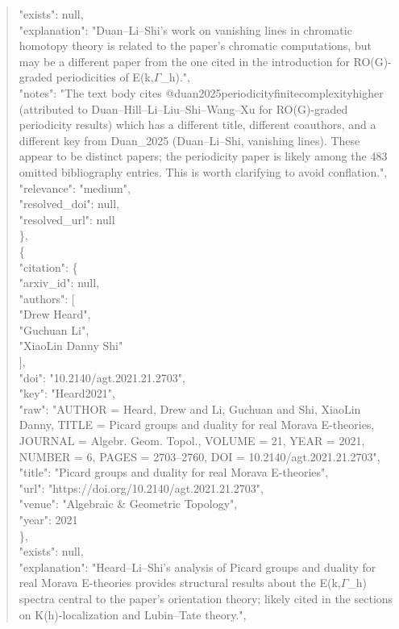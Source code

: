 \documentclass[11pt]{article}
\begin{document}
\begin{quote}
      "exists": null,\\
      "explanation": "Duan--Li--Shi's work on vanishing lines in chromatic homotopy theory is related to the paper's chromatic computations, but may be a different paper from the one cited in the introduction for RO(G)-graded periodicities of E(k,\ensuremath{\Gamma}\_h).",\\
      "notes": "The text body cites @duan2025periodicityfinitecomplexityhigher (attributed to Duan--Hill--Li--Liu--Shi--Wang--Xu for RO(G)-graded periodicity results) which has a different title, different coauthors, and a different key from Duan\_2025 (Duan--Li--Shi, vanishing lines). These appear to be distinct papers; the periodicity paper is likely among the 483 omitted bibliography entries. This is worth clarifying to avoid conflation.",\\
      "relevance": "medium",\\
      "resolved\_doi": null,\\
      "resolved\_url": null\\
    \},\\
    \{\\
      "citation": \{\\
        "arxiv\_id": null,\\
        "authors": [\\
          "Drew Heard",\\
          "Guchuan Li",\\
          "XiaoLin Danny Shi"\\
        ],\\
        "doi": "10.2140/agt.2021.21.2703",\\
        "key": "Heard2021",\\
        "raw": "AUTHOR = Heard, Drew and Li, Guchuan and Shi, XiaoLin Danny, TITLE = Picard groups and duality for real Morava E-theories, JOURNAL = Algebr. Geom. Topol., VOLUME = 21, YEAR = 2021, NUMBER = 6, PAGES = 2703--2760, DOI = 10.2140/agt.2021.21.2703",\\
        "title": "Picard groups and duality for real Morava E-theories",\\
        "url": "https://doi.org/10.2140/agt.2021.21.2703",\\
        "venue": "Algebraic \& Geometric Topology",\\
        "year": 2021\\
      \},\\
      "exists": null,\\
      "explanation": "Heard--Li--Shi's analysis of Picard groups and duality for real Morava E-theories provides structural results about the E(k,\ensuremath{\Gamma}\_h) spectra central to the paper's orientation theory; likely cited in the sections on K(h)-localization and Lubin--Tate theory.",\\

\end{quote}
\end{document}

